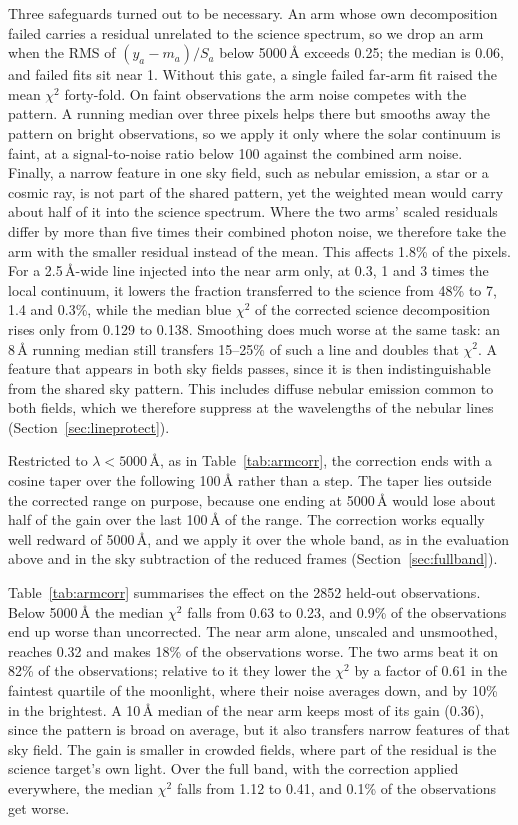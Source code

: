 Three safeguards turned out to be necessary. An arm whose own decomposition
failed carries a residual unrelated to the science spectrum, so we drop an
arm when the RMS of $(y_a-m_a)/S_a$ below 5000\,\AA{} exceeds 0.25; the
median is 0.06, and failed fits sit near 1. Without this gate, a single
failed far-arm fit raised the mean $\chi^2$ forty-fold. On faint
observations the arm noise competes with the pattern. A running median over
three pixels helps there but smooths away the pattern on bright
observations, so we apply it only where the solar continuum is faint, at a
signal-to-noise ratio below 100 against the combined arm noise. Finally, a
narrow feature in one sky field, such as nebular emission, a star or a
cosmic ray, is not part of the shared pattern, yet the weighted mean would
carry about half of it into the science spectrum. Where the two arms' scaled
residuals differ by more than five times their combined photon noise, we
therefore take the arm with the smaller residual instead of the mean. This
affects 1.8\% of the pixels. For a 2.5\,\AA-wide line injected into the near
arm only, at 0.3, 1 and 3 times the local continuum, it lowers the fraction
transferred to the science from 48\% to 7, 1.4 and 0.3\%, while the median
blue $\chi^2$ of the corrected science decomposition rises only from 0.129
to 0.138. Smoothing does much worse at the same task: an 8\,\AA{} running
median still transfers 15--25\% of such a line and doubles that $\chi^2$. A
feature that appears in both sky fields passes, since it is then
indistinguishable from the shared sky pattern. This includes diffuse
nebular emission common to both fields, which we therefore suppress at the
wavelengths of the nebular lines (Section~\ref{sec:lineprotect}).

Restricted to $\lambda<5000$\,\AA, as in Table~\ref{tab:armcorr}, the
correction ends with a cosine taper over the following 100\,\AA{} rather
than a step. The taper lies outside the corrected range on purpose, because
one ending at 5000\,\AA{} would lose about half of the gain over the last
100\,\AA{} of the range. The correction works equally well redward of
5000\,\AA, and we apply it over the whole band, as in the evaluation above
and in the sky subtraction of the reduced frames
(Section~\ref{sec:fullband}).

Table~\ref{tab:armcorr} summarises the effect on the 2852 held-out
observations. Below 5000\,\AA{} the median $\chi^2$ falls from 0.63 to 0.23,
and 0.9\% of the observations end up worse than uncorrected. The near arm
alone, unscaled and unsmoothed, reaches 0.32 and makes 18\% of the
observations worse. The two arms beat it on 82\% of the observations;
relative to it they lower the $\chi^2$ by a factor of 0.61 in the faintest
quartile of the moonlight, where their noise averages down, and by 10\% in
the brightest. A 10\,\AA{} median of the near arm keeps most of its gain
(0.36), since the pattern is broad on average, but it also transfers narrow
features of that sky field. The gain is smaller in crowded fields, where
part of the residual is the science target's own light. Over the full band,
with the correction applied everywhere, the median $\chi^2$ falls from 1.12
to 0.41, and 0.1\% of the observations get worse.

